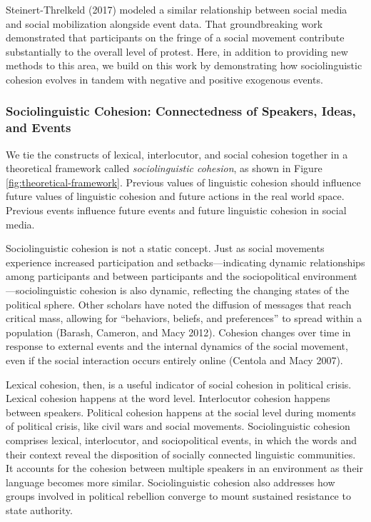 \documentclass[
  english,
  man]{apa6}
\begin{document}
Steinert-Threlkeld (2017) modeled a similar relationship
between social media and social mobilization alongside event data. That
groundbreaking work demonstrated that participants on the fringe of a social
movement contribute substantially to the overall level of protest. Here, in
addition to providing new methods to this area, we build on this work by
demonstrating how sociolinguistic cohesion evolves in tandem with negative and
positive exogenous events.

\hypertarget{sociolinguistic-cohesion-connectedness-of-speakers-ideas-and-events}{%
\subsubsection{Sociolinguistic Cohesion: Connectedness of Speakers, Ideas, and Events}\label{sociolinguistic-cohesion-connectedness-of-speakers-ideas-and-events}}

We tie the constructs of lexical, interlocutor, and social cohesion together in
a theoretical framework called \emph{sociolinguistic cohesion}, as shown in Figure
\ref{fig:theoretical-framework}. Previous values of linguistic cohesion should influence future values of linguistic cohesion and future actions in the real world space.
Previous events influence future events and future linguistic cohesion in
social media.

Sociolinguistic cohesion is not a static concept. Just as social movements
experience increased participation and setbacks---indicating dynamic
relationships among participants and between participants and the sociopolitical
environment---sociolinguistic cohesion is also dynamic, reflecting the changing
states of the political sphere. Other scholars have noted the diffusion of
messages that reach critical mass, allowing for \enquote{behaviors, beliefs, and
preferences} to spread within a population (Barash, Cameron, and Macy 2012). Cohesion
changes over time in response to external events and the internal dynamics of
the social movement, even if the social interaction occurs entirely
online (Centola and Macy 2007).

Lexical cohesion, then, is a useful indicator of social cohesion in political
crisis. Lexical cohesion happens at the word level. Interlocutor cohesion
happens between speakers. Political cohesion happens at the social level during
moments of political crisis, like civil wars and social movements.
Sociolinguistic cohesion comprises lexical, interlocutor, and sociopolitical
events, in which the words and their context reveal the disposition of socially
connected linguistic communities. It accounts for the cohesion between multiple
speakers in an environment as their language becomes more similar.
Sociolinguistic cohesion also addresses how groups involved in political
rebellion converge to mount sustained resistance to state authority.
\end{document}
